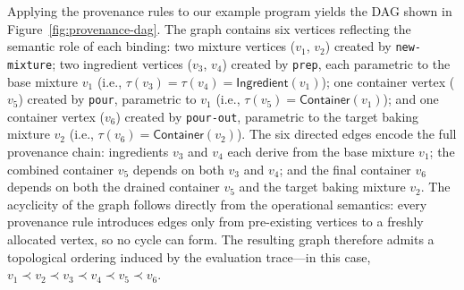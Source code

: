 \documentclass[11pt, a4paper]{article}
\begin{document}
Applying the provenance rules to our example program yields the DAG shown in Figure~\ref{fig:provenance-dag}. The graph contains six vertices reflecting the semantic role of each binding: two mixture vertices ($v_1$, $v_2$) created by \texttt{new-mixture}; two ingredient vertices ($v_3$, $v_4$) created by \texttt{prep}, each parametric to the base mixture $v_1$ (i.e., $\tau(v_3) = \tau(v_4) = \mathsf{Ingredient}(v_1)$); one container vertex ($v_5$) created by \texttt{pour}, parametric to $v_1$ (i.e., $\tau(v_5) = \mathsf{Container}(v_1)$); and one container vertex ($v_6$) created by \texttt{pour-out}, parametric to the target baking mixture $v_2$ (i.e., $\tau(v_6) = \mathsf{Container}(v_2)$). The six directed edges encode the full provenance chain: ingredients $v_3$ and $v_4$ each derive from the base mixture $v_1$; the combined container $v_5$ depends on both $v_3$ and $v_4$; and the final container $v_6$ depends on both the drained container $v_5$ and the target baking mixture $v_2$. The acyclicity of the graph follows directly from the operational semantics: every provenance rule introduces edges only from pre-existing vertices to a freshly allocated vertex, so no cycle can form. The resulting graph therefore admits a topological ordering induced by the evaluation trace—in this case, $v_1 \prec v_2 \prec v_3 \prec v_4 \prec v_5 \prec v_6$.
\end{document}
